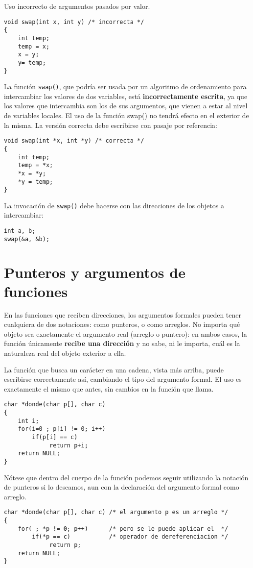 \begin{ejemplo}
Uso incorrecto de argumentos pasados por valor.
\begin{lstlisting}
void swap(int x, int y) /* incorrecta */
{
    int temp;
    temp = x;
    x = y;
    y= temp;
}
\end{lstlisting}
La función \texttt{swap()}, que podría ser usada por un algoritmo de ordenamiento para
intercambiar los valores de dos variables, está \textbf{incorrectamente escrita}, ya que
los valores que intercambia son los de sus argumentos, que vienen a estar al
nivel de variables locales. El uso de la función swap() no tendrá efecto en el
exterior de la misma. La versión correcta debe escribirse con pasaje por
referencia:
\begin{lstlisting}
void swap(int *x, int *y) /* correcta */
{
    int temp;
    temp = *x;
    *x = *y;
    *y = temp;
}
\end{lstlisting}

La invocación de \texttt{swap()} debe hacerse con las direcciones de los objetos a
intercambiar:
\begin{lstlisting}
int a, b;
swap(&a, &b);
\end{lstlisting}
\end{ejemplo}

\section{Punteros y argumentos de funciones}
En las funciones que reciben direcciones, los argumentos formales pueden tener
cualquiera de dos notaciones: como punteros, o como arreglos. No importa qué objeto 
sea exactamente el argumento real (arreglo o puntero): en ambos casos, la función únicamente
\textbf{recibe una dirección} y no sabe, ni le importa, cuál es la naturaleza real del objeto exterior a
ella.

\begin{ejemplo}
La función que busca un carácter en una cadena, vista más arriba, puede
escribirse correctamente así, cambiando el tipo del argumento formal. El uso es
exactamente el mismo que antes, sin cambios en la función que llama.
\begin{lstlisting}
char *donde(char p[], char c)
{
    int i;
    for(i=0 ; p[i] != 0; i++)
        if(p[i] == c)
             return p+i;
    return NULL;
}
\end{lstlisting}
Nótese que dentro del cuerpo de la función podemos seguir utilizando la
notación de punteros si lo deseamos, aun con la declaración del argumento
formal como arreglo.
\begin{lstlisting}
char *donde(char p[], char c) /* el argumento p es un arreglo */
{
    for( ; *p != 0; p++)      /* pero se le puede aplicar el  */
        if(*p == c)			  /* operador de dereferenciacion */
             return p;
    return NULL;
}
\end{lstlisting}
\end{ejemplo}


